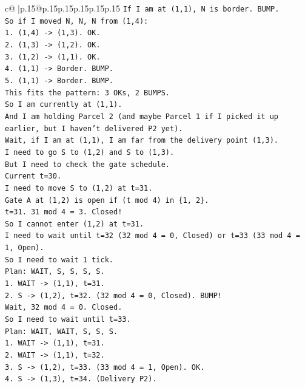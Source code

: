 \documentclass{article}
\begin{document}
{\begin{supertabular}{c@{$\;$}|p{.15\linewidth}@{}p{.15\linewidth}p{.15\linewidth}p{.15\linewidth}p{.15\linewidth}p{.15\linewidth}}
{{{\texttt{If I am at (1,1), N is border. BUMP.} \\
\texttt{So if I moved N, N, N from (1,4):} \\
\texttt{1. (1,4) {-}> (1,3). OK.} \\
\texttt{2. (1,3) {-}> (1,2). OK.} \\
\texttt{3. (1,2) {-}> (1,1). OK.} \\
\texttt{4. (1,1) {-}> Border. BUMP.} \\
\texttt{5. (1,1) {-}> Border. BUMP.} \\
\texttt{This fits the pattern: 3 OKs, 2 BUMPS.} \\
\texttt{So I am currently at (1,1).} \\
\texttt{And I am holding Parcel 2 (and maybe Parcel 1 if I picked it up earlier, but I haven't delivered P2 yet).} \\
\texttt{Wait, if I am at (1,1), I am far from the delivery point (1,3).} \\
\texttt{I need to go S to (1,2) and S to (1,3).} \\
\texttt{But I need to check the gate schedule.} \\
\texttt{Current t=30.} \\
\texttt{I need to move S to (1,2) at t=31.} \\
\texttt{Gate A at (1,2) is open if (t mod 4) in \{1, 2\}.} \\
\texttt{t=31. 31 mod 4 = 3. Closed!} \\
\texttt{So I cannot enter (1,2) at t=31.} \\
\texttt{I need to wait until t=32 (32 mod 4 = 0, Closed) or t=33 (33 mod 4 = 1, Open).} \\
\texttt{So I need to wait 1 tick.} \\
\texttt{Plan: WAIT, S, S, S, S.} \\
\texttt{1. WAIT {-}> (1,1), t=31.} \\
\texttt{2. S {-}> (1,2), t=32. (32 mod 4 = 0, Closed). BUMP!} \\
\texttt{Wait, 32 mod 4 = 0. Closed.} \\
\texttt{So I need to wait until t=33.} \\
\texttt{Plan: WAIT, WAIT, S, S, S.} \\
\texttt{1. WAIT {-}> (1,1), t=31.} \\
\texttt{2. WAIT {-}> (1,1), t=32.} \\
\texttt{3. S {-}> (1,2), t=33. (33 mod 4 = 1, Open). OK.} \\
\texttt{4. S {-}> (1,3), t=34. (Delivery P2).} \\
}}}
\end{supertabular}}
\end{document}
